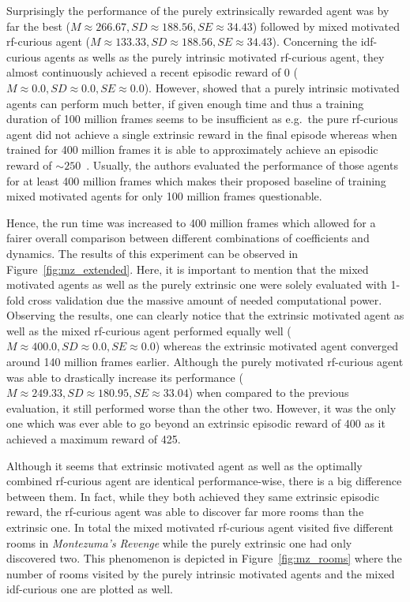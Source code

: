 \documentclass[draft,final]{vutinfth} %
\begin{document}
    Surprisingly the performance of the purely extrinsically rewarded agent was by far the best ($M\approx266.67,SD\approx188.56,SE\approx34.43$) followed by mixed motivated \gls{rf}-curious agent ($M\approx133.33,SD\approx188.56,SE\approx34.43$).
    Concerning the \gls{idf}-curious agents as wells as the purely intrinsic motivated \gls{rf}-curious agent, they almost continuously achieved a recent episodic reward of 0 ($M\approx0.0,SD\approx0.0,SE\approx0.0$).
    However, \citet{burda_large-scale_2018-1} showed that a purely intrinsic motivated agents can perform much better, if given enough time and thus a training duration of 100 million frames seems to be insufficient as e.g.\ the pure \gls{rf}-curious agent did not achieve a single extrinsic reward in the final episode whereas when trained for 400 million frames it is able to approximately achieve an episodic reward of $\sim250$~\citep[compare Figure 2]{burda_large-scale_2018-1}.
    Usually, the authors evaluated the performance of those agents for at least 400 million frames which makes their proposed baseline of training mixed motivated agents for only 100 million frames questionable.

    Hence, the run time was increased to 400 million frames which allowed for a fairer overall comparison between different combinations of coefficients and dynamics.
    The results of this experiment can be observed in Figure~\ref{fig:mz_extended}.
    Here, it is important to mention that the mixed motivated agents as well as the purely extrinsic one were solely evaluated with 1-fold cross validation due the massive amount of needed computational power.
    Observing the results, one can clearly notice that the extrinsic motivated agent as well as the mixed \gls{rf}-curious agent performed equally well ($M\approx400.0,SD\approx0.0,SE\approx0.0$) whereas the extrinsic motivated agent converged around 140 million frames earlier.
    Although the purely motivated \gls{rf}-curious agent was able to drastically increase its performance ($M\approx249.33,SD\approx180.95,SE\approx33.04$) when compared to the previous evaluation, it still performed worse than the other two.
    However, it was the only one which was ever able to go beyond an extrinsic episodic reward of 400 as it achieved a maximum reward of 425.

    Although it seems that extrinsic motivated agent as well as the optimally combined \gls{rf}-curious agent are identical performance-wise, there is a big difference between them.
    In fact, while they both achieved they same extrinsic episodic reward, the \gls{rf}-curious agent was able to discover far more rooms than the extrinsic one.
    In total the mixed motivated \gls{rf}-curious agent visited five different rooms in \textit{Montezuma's Revenge} while the purely extrinsic one had only discovered two.
    This phenomenon is depicted in Figure~\ref{fig:mz_rooms} where the number of rooms visited by the purely intrinsic motivated agents and the mixed \gls{idf}-curious one are plotted as well.
\end{document}
